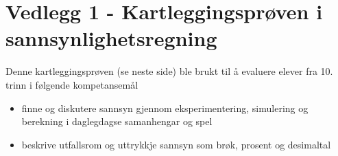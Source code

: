 \documentclass[main.tex]{subfiles}
\begin{document}
\appendix
\section*{Vedlegg 1 - Kartleggingsprøven i sannsynlighetsregning}
\label{sec:prove}
Denne kartleggingsprøven (se neste side) ble brukt til å evaluere elever fra 10. trinn
i følgende kompetansemål 
\begin{itemize}
\item finne og diskutere sannsyn gjennom eksperimentering, simulering og berekning i daglegdagse samanhengar og spel
\item beskrive utfallsrom og uttrykkje sannsyn som brøk, prosent og desimaltal
\end{itemize}


\end{document}
